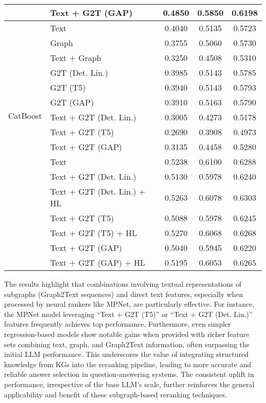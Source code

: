 \begin{table}[htbp]
\begin{tabular}{l p{5cm} c c c}
        & Text + G2T (GAP) & 0.4850 & 0.5850 & 0.6198 \\
        \midrule
        \multirow{12}{*}{CatBoost} & Text & 0.4040 & 0.5135 & 0.5723 \\
        & Graph & 0.3755 & 0.5060 & 0.5730 \\
        & Text + Graph & 0.3250 & 0.4508 & 0.5310 \\
        & G2T (Det. Lin.) & 0.3985 & 0.5143 & 0.5785 \\
        & G2T (T5) & 0.3940 & 0.5143 & 0.5793 \\
        & G2T (GAP) & 0.3910 & 0.5163 & 0.5790 \\
        & Text + G2T (Det. Lin.) & 0.3005 & 0.4273 & 0.5178 \\
        & Text + G2T (T5) & 0.2690 & 0.3908 & 0.4973 \\
        & Text + G2T (GAP) & 0.3135 & 0.4458 & 0.5280 \\
        \midrule
        \multirow{10}{*}{MPNet} & Text & 0.5238 & 0.6100 & 0.6288 \\
        & Text + G2T (Det. Lin.) & 0.5130 & 0.5978 & 0.6240 \\
        & Text + G2T (Det. Lin.) + HL & 0.5263 & 0.6078 & 0.6303 \\
        & Text + G2T (T5) & 0.5088 & 0.5978 & 0.6245 \\
        & Text + G2T (T5) + HL & 0.5270 & 0.6068 & 0.6268 \\
        & Text + G2T (GAP) & 0.5040 & 0.5945 & 0.6220 \\
        & Text + G2T (GAP) + HL & 0.5195 & 0.6053 & 0.6265 \\
        \bottomrule
    \end{tabular}
\end{table}

The results highlight that combinations involving textual representations of subgraphs (Graph2Text sequences) and direct text features, especially when processed by neural rankers like MPNet, are particularly effective. For instance, the MPNet model leveraging ``Text + G2T (T5)'' or ``Text + G2T (Det. Lin.)'' features frequently achieves top performance. Furthermore, even simpler regression-based models show notable gains when provided with richer feature sets combining text, graph, and Graph2Text information, often surpassing the initial LLM performance. This underscores the value of integrating structured knowledge from KGs into the reranking pipeline, leading to more accurate and reliable answer selection in question-answering systems. The consistent uplift in performance, irrespective of the base LLM's scale, further reinforces the general applicability and benefit of these subgraph-based reranking techniques.

